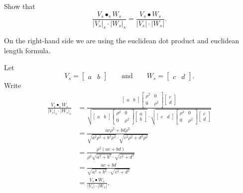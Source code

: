 \documentclass{ximera}
\begin{document}
\begin{problem}
  Show that
  \[
  \frac{V_s\bullet_s W_s}{|V_s|_s\cdot|W_s|_s} = \frac{V_s\bullet W_s}{|V_s|\cdot|W_s|}.
  \]
  \begin{hint}
    On the right-hand side we are using the euclidean dot product and
    euclidean length formula.
  \end{hint}
    \begin{freeResponse}
    Let
      \[
      V_s=
      \begin{bmatrix}
        a & b
      \end{bmatrix}
      \qquad\text{and}\qquad
      W_s=
      \begin{bmatrix}
        c & d
      \end{bmatrix}.
      \]
      Write
      \begin{align*}
        \frac{V_s\bullet_s W_s}{|V_s|_s\cdot|W_s|_s} &= \frac{
          \begin{bmatrix}
            a & b
          \end{bmatrix}
          \begin{bmatrix}
            \rho^2 & 0 \\
            0 & \rho^2
          \end{bmatrix}
          \begin{bmatrix}
            c\\
            d
          \end{bmatrix}
        }{
          \sqrt{\begin{bmatrix}
            a & b
          \end{bmatrix}
          \begin{bmatrix}
            \rho^2 & 0 \\
            0 & \rho^2
          \end{bmatrix}
          \begin{bmatrix}
            a\\
            b
          \end{bmatrix}}
          \cdot
          \sqrt{\begin{bmatrix}
            c & d
          \end{bmatrix}
          \begin{bmatrix}
            \rho^2 & 0 \\
            0 & \rho^2
          \end{bmatrix}
          \begin{bmatrix}
            c\\
            d
          \end{bmatrix}}
        }\\
        &= \frac{ac\rho^2 + bd\rho^2}{\sqrt{a^2\rho^2+b^2\rho^2}\cdot \sqrt{c^2\rho^2+d^2\rho^2}}\\
        &= \frac{\rho^2(ac + bd)}{\rho^2\sqrt{a^2+b^2}\cdot \sqrt{c^2+d^2}}\\
        &= \frac{ac + bd}{\sqrt{a^2+b^2}\cdot \sqrt{c^2+d^2}}\\
        &=\frac{V_s\bullet W_s}{|V_s|\cdot|W_s|}.
    \end{align*}
  \end{freeResponse}
\end{problem}
\end{document}
